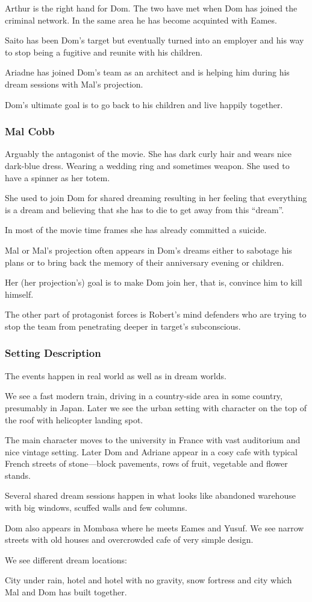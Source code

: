 \documentclass{article}
\begin{document}
Arthur is the right hand for Dom. The two have met when Dom has joined the
criminal network. In the same area he has become acquinted with Eames.

Saito has been Dom's target but eventually turned into an employer and his way
to stop being a fugitive and reunite with his children.

Ariadne has joined Dom's team as an architect and is helping him during his
dream sessions with Mal's projection.

Dom's ultimate goal is to go back to his children and live happily together.

\subsubsection*{Mal Cobb}

Arguably the antagonist of the movie. She has dark curly hair and wears nice
dark-blue dress. Wearing a wedding ring and sometimes weapon. She used to have a
spinner as her totem.

She used to join Dom for shared dreaming resulting in her feeling that
everything is a dream and believing that she has to die to get away from this
``dream''.

In most of the movie time frames she has already committed a suicide.

Mal or Mal's projection often appears in Dom's dreams either to sabotage his
plans or to bring back the memory of their anniversary evening or children.

Her (her projection's) goal is to make Dom join her, that is, convince him to
kill himself.

The other part of protagonist forces is Robert's mind defenders who are trying
to stop the team from penetrating deeper in target's subconscious.

\subsubsection*{Setting Description}

The events happen in real world as well as in dream worlds.

We see a fast modern train, driving in a country-side area in some country,
presumably in Japan. Later we see the urban setting with character on the top of
the roof with helicopter landing spot.

The main character moves to the university in France with vast auditorium and
nice vintage setting. Later Dom and Adriane appear in a cosy cafe with typical
French streets of stone---block pavements, rows of fruit, vegetable and flower
stands.

Several shared dream sessions happen in what looks like abandoned warehouse with
big windows, scuffed walls and few columns.

Dom also appears in Mombasa where he meets Eames and Yusuf. We see narrow
streets with old houses and overcrowded cafe of very simple design.

We see different dream locations:

City under rain, hotel and hotel with no gravity, snow fortress and city which
Mal and Dom has built together.
\end{document}
